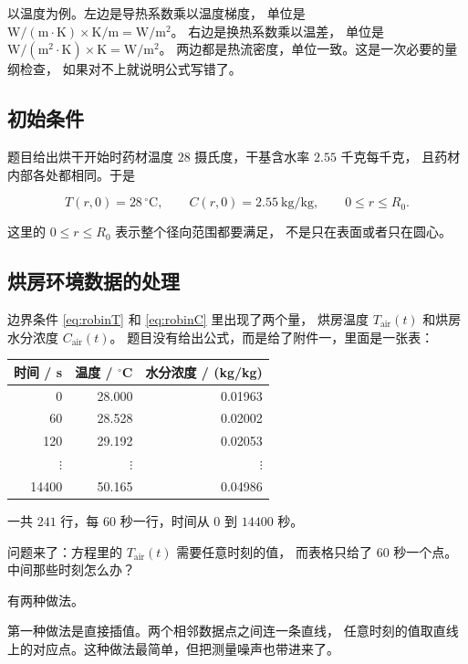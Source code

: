 以温度为例。左边是导热系数乘以温度梯度，
单位是 $\mathrm{W/(m\cdot K)}\times\mathrm{K/m}=\mathrm{W/m^2}$。
右边是换热系数乘以温差，
单位是 $\mathrm{W/(m^2\cdot K)}\times\mathrm{K}=\mathrm{W/m^2}$。
两边都是热流密度，单位一致。这是一次必要的量纲检查，
如果对不上就说明公式写错了。

\subsection{初始条件}

题目给出烘干开始时药材温度 $28$ 摄氏度，干基含水率 $2.55$ 千克每千克，
且药材内部各处都相同。于是

\begin{equation}
T(r,0)=28\,^\circ\mathrm{C},\qquad C(r,0)=2.55\ \mathrm{kg/kg},
\qquad 0\le r\le R_0 .
\label{eq:ic}
\end{equation}

这里的 $0\le r\le R_0$ 表示整个径向范围都要满足，
不是只在表面或者只在圆心。

\subsection{烘房环境数据的处理}

边界条件 \eqref{eq:robinT} 和 \eqref{eq:robinC} 里出现了两个量，
烘房温度 $T_{\mathrm{air}}(t)$ 和烘房水分浓度 $C_{\mathrm{air}}(t)$。
题目没有给出公式，而是给了附件一，里面是一张表：

\begin{center}
\begin{tabular}{@{}rrr@{}}
\toprule
时间 / s & 温度 / $^\circ$C & 水分浓度 / (kg/kg) \\
\midrule
0    & 28.000 & 0.01963 \\
60   & 28.528 & 0.02002 \\
120  & 29.192 & 0.02053 \\
$\vdots$ & $\vdots$ & $\vdots$ \\
14400 & 50.165 & 0.04986 \\
\bottomrule
\end{tabular}
\end{center}

一共 $241$ 行，每 $60$ 秒一行，时间从 $0$ 到 $14400$ 秒。

问题来了：方程里的 $T_{\mathrm{air}}(t)$ 需要任意时刻的值，
而表格只给了 $60$ 秒一个点。中间那些时刻怎么办？

有两种做法。

第一种做法是直接插值。两个相邻数据点之间连一条直线，
任意时刻的值取直线上的对应点。这种做法最简单，但把测量噪声也带进来了。


